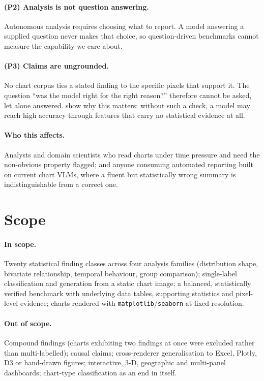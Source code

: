 \paragraph{(P2) Analysis is not question answering.} Autonomous analysis requires
choosing what to report. A model answering a supplied question never makes that
choice, so question-driven benchmarks cannot measure the capability we care
about.

\paragraph{(P3) Claims are ungrounded.} No chart corpus ties a stated finding to
the specific pixels that support it. The question ``was the model right for the
right reason?'' therefore cannot be asked, let alone answered. \citet{shortcut}
show why this matters: without such a check, a model may reach high accuracy
through features that carry no statistical evidence at all.

\paragraph{Who this affects.} Analysts and domain scientists who read charts under
time pressure and need the non-obvious property flagged; and anyone consuming
automated reporting built on current chart VLMs, where a fluent but statistically
wrong summary is indistinguishable from a correct one.

\section{Scope}

\paragraph{In scope.} Twenty statistical finding classes across four analysis
families (distribution shape, bivariate relationship, temporal behaviour, group
comparison); single-label classification and generation from a static chart
image; a balanced, statistically verified benchmark with underlying data tables,
supporting statistics and pixel-level evidence; charts rendered with
\texttt{matplotlib}/\texttt{seaborn} at fixed resolution.

\paragraph{Out of scope.} Compound findings (charts exhibiting two findings at
once were excluded rather than multi-labelled); causal claims; cross-renderer
generalisation to Excel, Plotly, D3 or hand-drawn figures; interactive, 3-D,
geographic and multi-panel dashboards; chart-type classification as an end in
itself.

